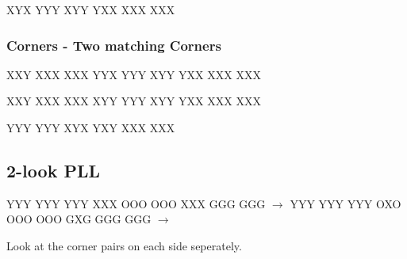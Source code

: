 \documentclass[9pt,dvipsnames]{extarticle}
\begin{document}
\begin{multicols*}{4}
\RubikCubeGreyAll%
\RubikFaceUp%
{X}{Y}{X}
{Y}{Y}{Y}
{X}{Y}{Y}
\RubikFaceFront%
{Y}{X}{X}
{X}{X}{X}
{X}{X}{X}

\subsubsection*{Corners - Two matching Corners}

\RubikCubeGreyAll%
\RubikFaceRight%
{X}{X}{Y}
{X}{X}{X}
{X}{X}{X}
\RubikFaceUp%
{Y}{Y}{X}
{Y}{Y}{Y}
{X}{Y}{Y}
\RubikFaceFront%
{Y}{X}{X}
{X}{X}{X}
{X}{X}{X}

\RubikCubeGreyAll%
\RubikFaceBack%
{X}{X}{Y}
{X}{X}{X}
{X}{X}{X}
\RubikFaceUp%
{X}{Y}{Y}
{Y}{Y}{Y}
{X}{Y}{Y}
\RubikFaceFront%
{Y}{X}{X}
{X}{X}{X}
{X}{X}{X}

\RubikCubeGreyAll%
\RubikFaceUp%
{Y}{Y}{Y}
{Y}{Y}{Y}
{X}{Y}{X}
\RubikFaceFront%
{Y}{X}{Y}
{X}{X}{X}
{X}{X}{X}

\columnbreak
\subsection*{2-look PLL}


\noindent%
\RubikFaceUp%
{Y}{Y}{Y}
{Y}{Y}{Y}
{Y}{Y}{Y}%
\RubikFaceRight%
{X}{X}{X}
{O}{O}{O}
{O}{O}{O}%
\RubikFaceFront%
{X}{X}{X}
{G}{G}{G}
{G}{G}{G}%
\ShowCube{\cubesize}{\cubescale}{\DrawRubikCube}%
$\rightarrow$%
\noindent%
\RubikFaceUp%
{Y}{Y}{Y}
{Y}{Y}{Y}
{Y}{Y}{Y}%
\RubikFaceRight%
{O}{X}{O}
{O}{O}{O}
{O}{O}{O}%
\RubikFaceFront%
{G}{X}{G}
{G}{G}{G}
{G}{G}{G}%
\ShowCube{\cubesize}{\cubescale}{\DrawRubikCube}%
$\rightarrow$%
\RubikCubeSolved%
\ShowCube{\cubesize}{\cubescale}{\DrawRubikCube}

Look at the corner pairs on each side seperately.


\end{multicols*}
\end{document}
